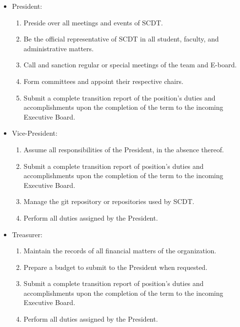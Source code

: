 \documentclass[12pt]{constitution}
\begin{document}
\begin{itemize}
    \item President:
        \begin{enumerate}
            \item Preside over all meetings and events of SCDT.
            \item Be the official representative of SCDT in all student,
            faculty, and administrative matters. 
            \item Call and sanction regular or special meetings of the team and
            E-board.
            \item Form committees and appoint their respective chairs. 
            \item Submit a complete transition report of the position’s duties
            and accomplishments upon the completion of the term to the incoming
            Executive Board.
        \end{enumerate}

    \item Vice-President:
        \begin{enumerate}
            \item Assume all responsibilities of the President, in the absence
            thereof.
            \item Submit a complete transition report of position’s duties and
            accomplishments upon the completion of the term to the incoming
            Executive Board.
            \item Manage the git repository or repositories used by SCDT.
            \item Perform all duties assigned by the President.
        \end{enumerate}

    \item Treasurer:
        \begin{enumerate}
            \item Maintain the records of all financial matters of the
            organization.
            \item Prepare a budget to submit to the President when requested.
            \item Submit a complete transition report of position’s duties and
            accomplishments upon the completion of the term to the incoming
            Executive Board.
            \item Perform all duties assigned by the President.
        \end{enumerate}


\end{itemize}
\end{document}
